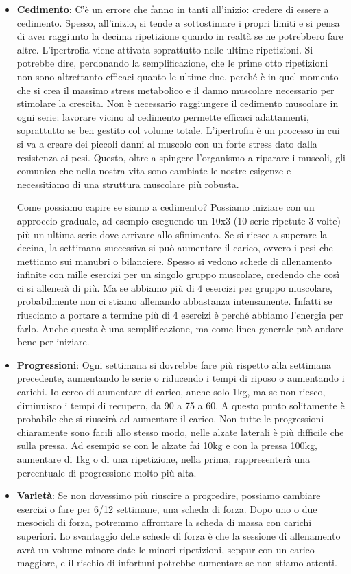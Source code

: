 \documentclass[12pt]{book} %
\begin{document}
\begin{itemize}
\item \textbf{Cedimento}:
C'è un errore che fanno in tanti all'inizio: credere di essere a cedimento.
Spesso, all'inizio, si tende a sottostimare i propri limiti e si pensa di aver raggiunto la decima ripetizione quando in realtà se ne potrebbero fare altre.
L'ipertrofia viene attivata soprattutto nelle ultime ripetizioni. Si potrebbe dire, perdonando la semplificazione, che le prime otto ripetizioni non sono altrettanto efficaci quanto le ultime due, perché è in quel momento che si crea il massimo stress metabolico e il danno muscolare necessario per stimolare la crescita. Non è necessario raggiungere il cedimento muscolare in ogni serie: lavorare vicino al cedimento permette efficaci adattamenti, soprattutto se ben gestito col volume totale.
L'ipertrofia è un processo in cui si va a creare dei piccoli danni al muscolo con un forte stress dato dalla resistenza ai pesi. Questo, oltre a spingere l'organismo a riparare i muscoli, gli comunica che nella nostra vita sono cambiate le nostre esigenze e necessitiamo di una struttura muscolare più robusta.

Come possiamo capire se siamo a cedimento?
Possiamo iniziare con un approccio graduale, ad esempio eseguendo un 10x3 (10 serie ripetute 3 volte) più un ultima serie dove arrivare allo sfinimento. Se si riesce a superare la decina, la settimana successiva si può aumentare il carico, ovvero i pesi che mettiamo sui manubri o bilanciere.
Spesso si vedono schede di allenamento infinite con mille esercizi per un singolo gruppo muscolare, credendo che così ci si allenerà di più. Ma se abbiamo più di 4 esercizi per gruppo muscolare, probabilmente non ci stiamo allenando abbastanza intensamente. Infatti se riusciamo a portare a termine più di 4 esercizi è perché abbiamo l'energia per farlo. Anche questa è una semplificazione, ma come linea generale può andare bene per iniziare.

\item \textbf{Progressioni}:
Ogni settimana si dovrebbe fare più rispetto alla settimana precedente, aumentando le serie o riducendo i tempi di riposo o aumentando i carichi.
Io cerco di aumentare di carico, anche solo 1kg, ma se non riesco, diminuisco i tempi di recupero, da 90 a 75 a 60. A questo punto solitamente è probabile che si riuscirà ad aumentare il carico.
Non tutte le progressioni chiaramente sono facili allo stesso modo, nelle alzate laterali è più difficile che sulla pressa. Ad esempio se con le alzate fai 10kg e con la pressa 100kg, aumentare di 1kg o di una ripetizione, nella prima, rappresenterà una percentuale di progressione molto più alta.

\item \textbf{Varietà}:
Se non dovessimo più riuscire a progredire, possiamo cambiare esercizi o fare per 6/12 settimane, una scheda di forza. Dopo uno o due mesocicli di forza, potremmo affrontare la scheda di massa con carichi superiori. Lo svantaggio delle schede di forza è che la sessione di allenamento avrà un volume minore date le minori ripetizioni, seppur con un carico maggiore, e il rischio di infortuni potrebbe aumentare se non stiamo attenti.
\end{itemize}
\end{document}
